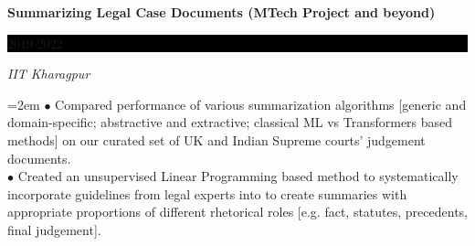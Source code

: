 \documentclass[paper=a4,fontsize=10pt]{scrartcl} %
\newcommand{\sepspace}{\vspace*{0.6em}}		%
\newcommand{\NewPart}[1]{\section*{\uppercase{#1}}}
\newcommand{\EducationEntry}[4]{
		\noindent \textbf{#1} \hfill      %
		\colorbox{Black}{%
			\parbox{6em}{%
			\hfill\color{White}#2}} \par  %
		\noindent \textit{#3} \par        %
		\noindent\hangindent=2em\hangafter=0 \small #4 %
		\normalsize \par}
\begin{document}
{%

\EducationEntry{Summarizing Legal Case Documents (MTech Project and beyond)}{2019-2022}{IIT Kharagpur}{\noindent $\bullet$ Compared performance of various summarization algorithms [generic and domain-specific; abstractive and extractive; classical ML vs Transformers based methods] on our curated set of UK and Indian Supreme courts'  judgement documents. \\
\noindent $\bullet$ Created an unsupervised Linear Programming based method to systematically incorporate guidelines from legal experts into to create summaries with appropriate proportions of different rhetorical roles [e.g. fact, statutes, precedents, final judgement].
}














}
\end{document}
